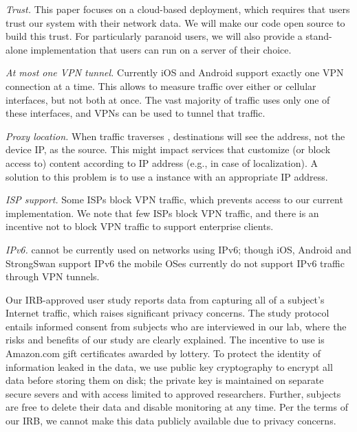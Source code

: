 \noindent\emph{Trust.} This paper focuses on a cloud-based \meddle deployment, which requires 
that users trust our system with their network data. We will make our code open source to build this 
trust. For particularly paranoid users, we will also provide a stand-alone implementation that users 
can run on a server of their choice.

\noindent\emph{At most one VPN tunnel.}
Currently iOS and Android support exactly one VPN connection at a time. 
This allows \meddle to measure traffic over either \wifi or cellular interfaces, but not both at once.
The vast majority of traffic uses only one of these interfaces, and VPNs can be used to tunnel that traffic.

\noindent\emph{Proxy location.} 
When traffic traverses \meddle, destinations will see the \meddle address, not the device IP, as the source. 
This might impact services  that customize (or block access to) content according to IP address (e.g., in case of localization). 
A solution to this problem is to use a \meddle{} instance with an appropriate IP address.

\noindent\emph{ISP support.}
Some ISPs block VPN traffic, which prevents access to our current \meddle implementation. 
We note that few ISPs block VPN traffic, and there is an incentive not to block VPN traffic to 
support enterprise clients.

\noindent\emph{IPv6.}
\meddle{} cannot be currently used on networks using IPv6; though iOS, Android and StrongSwan support IPv6 
the mobile OSes currently do not support IPv6 traffic through VPN tunnels.


 Our IRB-approved user study reports data from capturing all of a 
subject's Internet traffic, which raises significant privacy concerns.  
The study protocol entails informed consent
from subjects who are interviewed in our lab, where the risks and
benefits of our study are clearly explained.  The incentive to use
\meddle is Amazon.com gift certificates awarded by lottery. To protect the
identity of information leaked in the data, we use public key
cryptography to encrypt all data before storing them 
on disk; the private key is
maintained on separate secure severs and with access limited to
approved researchers.  Further, subjects are free to delete their
data and disable monitoring at any time.  Per the terms of our IRB, we cannot 
make this data publicly available due to privacy concerns. 

